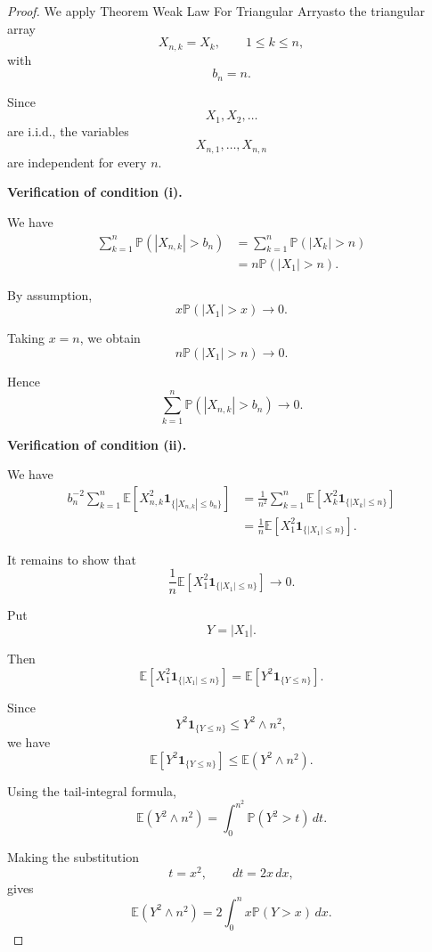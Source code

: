 \begin{proof}

We apply Theorem Weak Law For Triangular Arryasto the triangular
array
\[
X_{n,k}=X_k,
\qquad
1\leq k\leq n,
\]
with
\[
b_n=n.
\]

Since
\[
X_1,X_2,\ldots
\]
are i.i.d., the variables
\[
X_{n,1},\ldots,X_{n,n}
\]
are independent for every $n$.

\medskip

\noindent
\textbf{Verification of condition (i).}

We have
\[
\begin{aligned}
\sum_{k=1}^n
\mathbb{P}(|X_{n,k}|>b_n)
&=
\sum_{k=1}^n
\mathbb{P}(|X_k|>n)\\
&=
n\mathbb{P}(|X_1|>n).
\end{aligned}
\]

By assumption,
\[
x\mathbb{P}(|X_1|>x)
\longrightarrow0.
\]

Taking $x=n$, we obtain
\[
n\mathbb{P}(|X_1|>n)
\longrightarrow0.
\]

Hence
\[
\boxed{
\sum_{k=1}^n
\mathbb{P}(|X_{n,k}|>b_n)
\longrightarrow0.
}
\tag{1}
\]

\medskip

\noindent
\textbf{Verification of condition (ii).}

We have
\[
\begin{aligned}
b_n^{-2}
\sum_{k=1}^n
\mathbb{E}
\left[
X_{n,k}^2
\mathbf{1}_{\{|X_{n,k}|\leq b_n\}}
\right]
&=
\frac{1}{n^2}
\sum_{k=1}^n
\mathbb{E}
\left[
X_k^2
\mathbf{1}_{\{|X_k|\leq n\}}
\right]\\
&=
\frac{1}{n}
\mathbb{E}
\left[
X_1^2
\mathbf{1}_{\{|X_1|\leq n\}}
\right].
\end{aligned}
\tag{2}
\]

It remains to show that
\[
\frac{1}{n}
\mathbb{E}
\left[
X_1^2
\mathbf{1}_{\{|X_1|\leq n\}}
\right]
\longrightarrow0.
\tag{3}
\]

Put
\[
Y=|X_1|.
\]

Then
\[
\mathbb{E}
\left[
X_1^2
\mathbf{1}_{\{|X_1|\leq n\}}
\right]
=
\mathbb{E}
\left[
Y^2
\mathbf{1}_{\{Y\leq n\}}
\right].
\]

Since
\[
Y^2\mathbf{1}_{\{Y\leq n\}}
\leq
Y^2\wedge n^2,
\]
we have
\[
\mathbb{E}
\left[
Y^2\mathbf{1}_{\{Y\leq n\}}
\right]
\leq
\mathbb{E}(Y^2\wedge n^2).
\]

Using the tail-integral formula,
\[
\mathbb{E}(Y^2\wedge n^2)
=
\int_0^{n^2}
\mathbb{P}(Y^2>t)\,dt.
\]

Making the substitution
\[
t=x^2,
\qquad
dt=2x\,dx,
\]
gives
\[
\mathbb{E}(Y^2\wedge n^2)
=
2\int_0^n
x\mathbb{P}(Y>x)\,dx.
\]


\end{proof}
